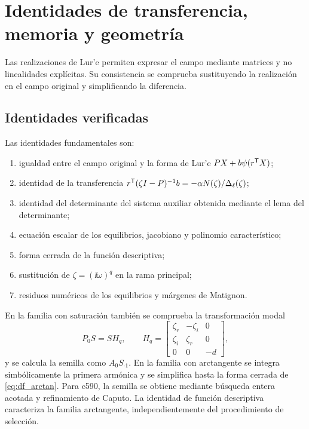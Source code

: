 \section{Identidades de transferencia, memoria y geometría}
\label{app:wolfram}

Las realizaciones de Lur'e permiten expresar el campo mediante matrices y
no linealidades explícitas. Su consistencia se comprueba sustituyendo la
realización en el campo original y simplificando la diferencia.

\subsection{Identidades verificadas}

Las identidades fundamentales son:
\begin{enumerate}
 \item igualdad entre el campo original y la forma de Lur'e
 \(PX+b\psi(r^{\mathsf T}X)\);
 \item identidad de la transferencia
 \(r^{\mathsf T}(\zeta I-P)^{-1}b=-\alpha N(\zeta)/\Delta_\ell(\zeta)\);
 \item identidad del determinante del sistema auxiliar obtenida mediante el
 lema del determinante;
 \item ecuación escalar de los equilibrios, jacobiano y polinomio
 característico;
 \item forma cerrada de la función descriptiva;
 \item sustitución de \(\zeta=(\ii\omega)^q\) en la rama principal;
 \item residuos numéricos de los equilibrios y márgenes de Matignon.
\end{enumerate}

En la familia con saturación también se comprueba la transformación modal
\begin{equation}
P_0S=SH_q,\qquad
H_q=
\begin{bmatrix}
\zeta_r&-\zeta_i&0\\
\zeta_i& \zeta_r&0\\
0&0&-d
\end{bmatrix},
\label{eq:wolfram_similitud}
\end{equation}
y se calcula la semilla como \(A_0S_{\cdot1}\). En la familia con arctangente
se integra simbólicamente la primera armónica y se simplifica hasta la forma
cerrada de \cref{eq:df_arctan}. Para c590, la semilla se obtiene mediante búsqueda entera acotada y
refinamiento de Caputo. La identidad de función descriptiva caracteriza la
familia arctangente, independientemente del procedimiento de selección.


